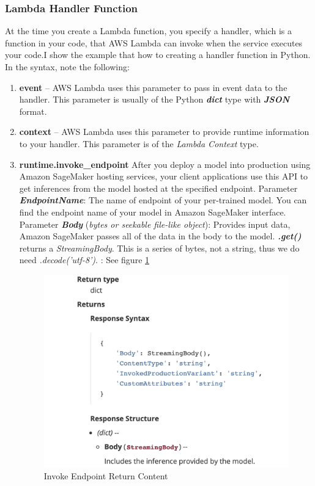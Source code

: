 \documentclass[12pt]{article}
\begin{document}
\subsubsection{Lambda Handler Function}
At the time you create a Lambda function, you specify a handler, which is a function in your code, that AWS Lambda can invoke when the service executes your code.I show the example that how to creating a handler function in Python. 
\\
\noindent
In the syntax, note the following:
\begin{enumerate}
\item \textbf{event} – AWS Lambda uses this parameter to pass in event data to the handler. This parameter is usually of the Python \textbf{\textit{dict}} type with \textbf{\textit{JSON}} format. 
\item \textbf{context} – AWS Lambda uses this parameter to provide runtime information to your handler. This parameter is of the \textit{Lambda Context} type.
\item \textbf{runtime.invoke\_endpoint} After you deploy a model into production using Amazon SageMaker hosting services, your client applications use this API to get inferences from the model hosted at the specified endpoint. Parameter \textbf{\textit{EndpointName}}: The name of endpoint of your per-trained model. You can find the endpoint name of your model in Amazon SageMaker interface.
Parameter \textbf{\textit{Body}} (\textit{bytes or seekable file-like object}): Provides input data, Amazon SageMaker passes all of the data in the body to the model. \textit{\textbf{.get()}} returns a \textit{StreamingBody}. This is a series of bytes, not a string, thus we do need \textit{.decode('utf-8')}. : See figure \ref{fig:Lambda_function_return_type}\\

\begin{figure}[H]
\centering
\begin{minipage}{1\textwidth}
  \centering
  \includegraphics[width=.6\linewidth]{Lambda_function_return_type.png}
   \caption{Invoke Endpoint Return Content}
   \label{fig:Lambda_function_return_type}
\end{minipage}%
\end{figure}
\end{enumerate}
\end{document}
